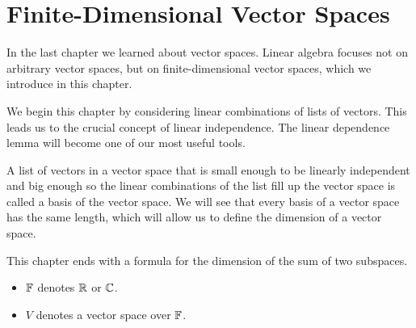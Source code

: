 \chapter{Finite-Dimensional Vector Spaces}

In the last chapter we learned about vector spaces. Linear algebra focuses not
on arbitrary vector spaces, but on finite-dimensional vector spaces, which we
introduce in this chapter.

We begin this chapter by considering linear combinations of lists of vectors.
This leads us to the crucial concept of linear independence. The linear
dependence lemma will become one of our most useful tools.

A list of vectors in a vector space that is small enough to be linearly
independent and big enough so the linear combinations of the list fill up the
vector space is called a basis of the vector space. We will see that every basis
of a vector space has the same length, which will allow us to define the
dimension of a vector space.

This chapter ends with a formula for the dimension of the sum of two subspaces.

\begin{definition*}\leavevmode
\begin{itemize}
\item $\mathbb{F}$ denotes $\mathbb{R}$ or $\mathbb{C}$.
\item $V$ denotes a vector space over $\mathbb{F}$.
\end{itemize}
\end{definition*}
